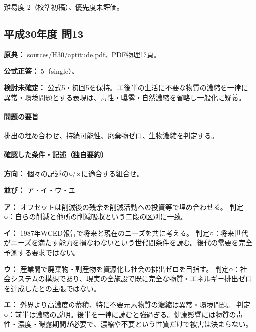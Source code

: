 \par 難易度 2（校準初稿）、優先度未評価。

\subsection{平成30年度 問13}
\label{q:h30-reg-apt-13}

\noindent\textbf{原典：} sources/H30/aptitude.pdf、PDF物理13頁。

\textbf{公式正答：} 5（single）。

\par\textbf{検討未確定：} 公式5・初回5を保持。エ後半の生活に不要な物質の濃縮を一律に異常・環境問題とする表現は、毒性・曝露・自然濃縮を省略し一般化に疑義。

\paragraph{問題の要旨} 排出の埋め合わせ、持続可能性、廃棄物ゼロ、生物濃縮を判定する。

\paragraph{確認した条件・記述（独自要約）}\mbox{}\par

\noindent\textbf{方向：} 個々の記述の○/×に適合する組合せ。\par

\noindent\textbf{並び：} ア・イ・ウ・エ\par

\noindent\textbf{ア：} オフセットは削減後の残余を削減活動への投資等で埋め合わせる。 判定○：自らの削減と他所の削減吸収という二段の区別に一致。\par

\noindent\textbf{イ：} 1987年WCED報告で将来と現在のニーズを共に考える。 判定○：将来世代がニーズを満たす能力を損なわないという世代間条件を読む。後代の需要を完全予測する要求ではない。\par

\noindent\textbf{ウ：} 産業間で廃棄物・副産物を資源化し社会の排出ゼロを目指す。 判定○：社会システムの構想であり、現実の全施設で既に完全な物質・エネルギー排出ゼロを達成したとの主張ではない。\par

\noindent\textbf{エ：} 外界より高濃度の蓄積、特に不要元素物質の濃縮は異常・環境問題。 判定○：前半は濃縮の説明。後半を一律に読むと強過ぎる。健康影響には物質の毒性・濃度・曝露期間が必要で、濃縮や不要という性質だけで被害は決まらない。\par

